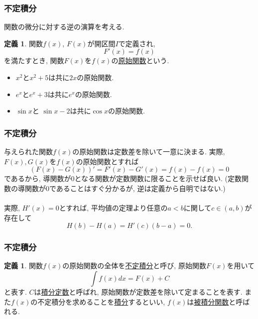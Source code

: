 \documentclass[dvipdfmx,cjk,10.2pt]{beamer}
\theoremstyle{definition}
\newtheorem{Def}[Thm]{定義}
\begin{document}
\begin{frame}
\frametitle{不定積分}

関数の微分に対する逆の演算を考える. 

\begin{Def}
関数$f(x)$, $F(x)$が開区間$I$で定義され, 
$$
F'(x) = f(x)
$$
を満たすとき, 関数$F(x)$を$f(x)$の\underline{原始関数}という. 
\end{Def}


\begin{itemize}
\item $x^2$と$x^2+5$は共に$2x$の原始関数. 
\item $e^x$と$e^x+3$は共に$e^x$の原始関数. 
\item $\sin x$と $\sin x-2$は共に$\cos x$の原始関数. 
\end{itemize}

\end{frame}




\begin{frame}
\frametitle{不定積分}

与えられた関数$f(x)$の原始関数は定数差を除いて一意に決まる. 
実際, $F(x), G(x)$を$f(x)$の原始関数とすれば
$$
(F(x)-G(x))'=F'(x)-G'(x)=f(x)-f(x)=0
$$
であるから, 導関数が$0$となる関数が定数関数に限ることを示せば良い. 
(定数関数の導関数が$0$であることはすぐ分かるが, 逆は定義から自明ではない.)\\
\ \\

実際, $H'(x)=0$とすれば, 平均値の定理より任意の$a<b$に関して$c \in (a,b)$が存在して
$$
H(b)-H(a)=H'(c)(b-a)=0. 
$$

\end{frame}






\begin{frame}
\frametitle{不定積分}


\begin{Def}
関数$f(x)$の原始関数の全体を\underline{不定積分}と呼び, 原始関数$F(x)$を用いて   
$$
\int f(x)dx = F(x)+C
$$
と表す. $C$は\underline{積分定数}と呼ばれ, 原始関数が定数差を除いて定まることを表す. 
また$f(x)$の不定積分を求めることを\underline{積分}するといい, $f(x)$は\underline{被積分関数}と呼ばれる.  
\end{Def}
 


\end{frame}
\end{document}
